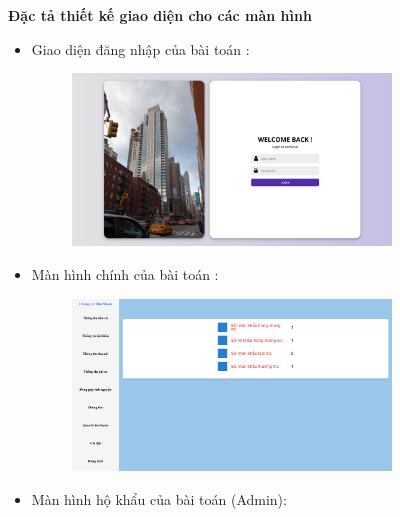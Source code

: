 \documentclass{article}
\begin{document}
\textbf{Đặc tả thiết kế giao diện cho các màn hình}
\begin{itemize}
    \item Giao diện đăng nhập của bài toán :
    \begin{figure}[H]
        \centering
        \includegraphics[width=0.8\textwidth]{Ảnh chương 4/Đăng nhập 1.png}
    \end{figure}
    \item Màn hình chính của bài toán :
    \begin{figure}[H]
        \centering
        \includegraphics[width=0.8\textwidth]{Ảnh chương 4/Màn hình chính 1.png}
    \end{figure}
    \vspace{1cm}
    \item Màn hình hộ khẩu của bài toán (Admin):
    \begin{figure}[H]
        \centering

\end{figure}
\end{itemize}
\end{document}
